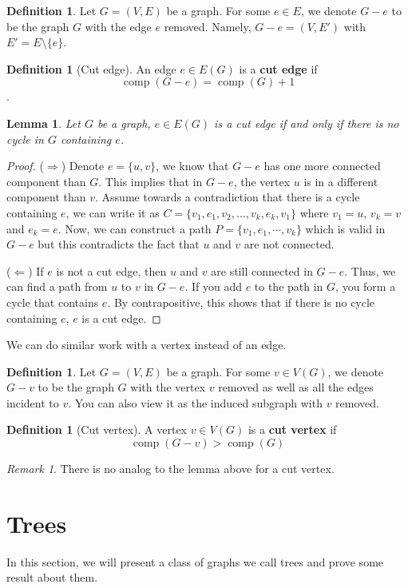 \documentclass{tufte-handout}
\newtheorem{lem}[thm]{Lemma}
\theoremstyle{definition}
\newtheorem{defn}[thm]{Definition}
\theoremstyle{remark}
\newtheorem{rem}[thm]{Remark}
\DeclareMathOperator{\comp}{comp}
\begin{document}
\begin{defn}
	Let $G = (V,E)$ be a graph. For some $e \in E$, we denote $G-e$ to be the graph $G$ with the edge $e$ removed. Namely, $G-e = (V,E')$ with $E' = E \setminus \{e\}$.
\end{defn}
\begin{defn}[Cut edge]
	An edge $e \in E(G)$ is a \textbf{cut edge} if $$\comp{(G-e)} = \comp{(G)} + 1$$.
\end{defn}
\begin{lem}
	Let $G$ be a graph, $e \in E(G)$ is a cut edge if and only if there is no cycle in $G$ containing $e$.
\end{lem}
\begin{proof}
	($\Rightarrow$) Denote $e = \{u,v\}$, we know that $G-e$ has one more connected component than $G$. This implies that in $G-e$, the vertex $u$ is in a different component than $v$. Assume towards a contradiction that there is a cycle containing $e$, we can write it as $C = \{v_1, e_1, v_2, \dots, v_k, e_k, v_1\}$ where $v_1 = u$, $v_k = v$ and $e_k = e$. Now, we can construct a path $P = \{v_1, e_1, \cdots, v_k\}$ which is valid in $G-e$ but this contradicts the fact that $u$ and $v$ are not connected.
	
	($\Leftarrow$) If $e$ is not a cut edge, then $u$ and $v$ are still connected in $G-e$. Thus, we can find a path from $u$ to $v$ in $G-e$. If you add $e$ to the path in $G$, you form a cycle that contains $e$. By contrapositive, this shows that if there is no cycle containing $e$, $e$ is a cut edge.
\end{proof}
We can do similar work with a vertex instead of an edge.
\begin{defn}
	Let $G= (V,E)$ be a graph. For some $v \in V(G)$, we denote $G-v$ to be the graph $G$ with the vertex $v$ removed as well as all the edges incident to $v$. You can also view it as the induced subgraph with $v$ removed. 
\end{defn}
\begin{defn}[Cut vertex]
	A vertex $v \in V(G)$ is a \textbf{cut vertex} if $$\comp{(G-v)} > \comp{(G)}$$
\end{defn}
\begin{rem}
	There is no analog to the lemma above for a cut vertex.
\end{rem}

\section{Trees}
In this section, we will present a class of graphs we call trees and prove some result about them.
\end{document}
